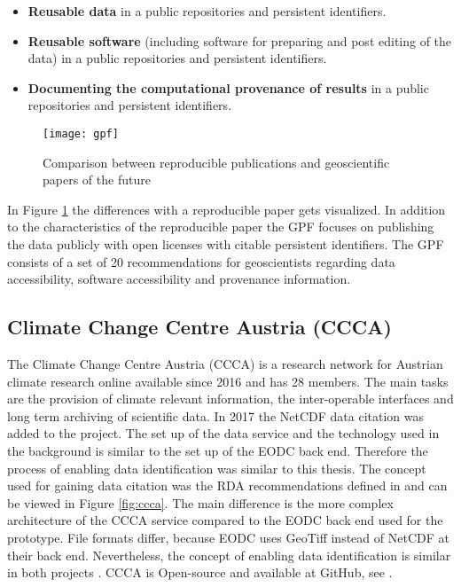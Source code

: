 \documentclass[draft,final]{vutinfth} %
\begin{document}
\begin{itemize}
	\item \textbf{Reusable data} in a public repositories and persistent identifiers.
	\item \textbf{Reusable software} (including software for preparing and post editing of the data) in a  public repositories and persistent identifiers.
	\item \textbf{Documenting the computational provenance of results} in a public repositories and persistent identifiers.  
\end{itemize}

\begin{figure}[h]
	\centering
	\texttt{[image: gpf]}
	\caption{Comparison between reproducible publications and geoscientific papers of the future \cite{Gil2016TowardTG}}
	\label{fig:gpf} %
\end{figure}

In Figure \ref{fig:gpf} the differences with a reproducible paper gets visualized. In addition to the characteristics of the reproducible paper the GPF focuses on publishing the data publicly with open licenses with citable persistent identifiers.
The GPF consists of a set of 20 recommendations for geoscientists regarding data accessibility, software accessibility and provenance information. 

\subsection{Climate Change Centre Austria (CCCA)}
The Climate Change Centre Austria (CCCA) is a research network for Austrian climate research online available since 2016 and has 28 members. The main tasks are the provision of climate relevant information, the inter-operable interfaces and long term archiving of scientific data. In 2017 the NetCDF data citation was added to the project. The set up of the data service and the technology used in the background is similar to the set up of the EODC back end. Therefore the process of enabling data identification was similar to this thesis. The concept used for gaining data citation was the RDA recommendations defined in \cite{rauber2016identification} and can be viewed in Figure \ref{fig:ccca}. The main difference is the more complex architecture of the CCCA service compared to the EODC back end used for the prototype. File formats differ, because EODC uses GeoTiff instead of NetCDF at their back end. Nevertheless, the concept of enabling data identification is similar in both projects \cite{ccca}. CCCA is Open-source and available at GitHub, see \cite{ccca_github}.  
\end{document}
